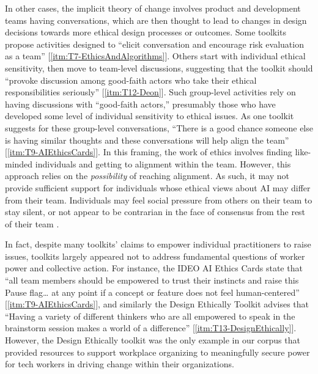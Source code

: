 \documentclass[acmsmall]{acmart}
\begin{document}
In other cases, the implicit theory of change involves product and development teams having conversations, which are then thought to lead to changes in design decisions towards more ethical design processes or outcomes. Some toolkits propose activities designed to ``elicit conversation and encourage risk evaluation as a team'' [\ref{itm:T7-EthicsAndAlgorithms}]. Others start with individual ethical sensitivity, then move to team-level discussions, suggesting that the toolkit should ``provoke discussion among good-faith actors who take their ethical responsibilities seriously'' [\ref{itm:T12-Deon}]. Such group-level activities rely on having discussions with ``good-faith actors,'' presumably those who have developed some level of individual sensitivity to ethical issues. As one toolkit suggests for these group-level conversations, ``There is a good chance someone else is having similar thoughts and these conversations will help align the team'' [\ref{itm:T9-AIEthicsCards}]. In this framing, the work of ethics involves finding like-minded individuals and getting to alignment within the team. However, this approach relies on the \textit{possibility} of reaching alignment. As such, it may not provide sufficient support for individuals whose ethical views about AI may differ from their team. Individuals may feel social pressure from others on their team to stay silent, or not appear to be contrarian in the face of consensus from the rest of their team \cite[cf.][]{madaio2020co}.

In fact, despite many toolkits' claims to empower individual practitioners to raise issues, toolkits largely appeared not to address fundamental questions of worker power and collective action. For instance, the IDEO AI Ethics Cards state that ``all team members should be empowered to trust their instincts and raise this Pause flag… at any point if a concept or feature does not feel human-centered'' [\ref{itm:T9-AIEthicsCards}], and similarly the Design Ethically Toolkit advises that ``Having a variety of different thinkers who are all empowered to speak in the brainstorm session makes a world of a difference'' [\ref{itm:T13-DesignEthically}]. However, the Design Ethically toolkit was the only example in our corpus that provided resources to support workplace organizing to meaningfully secure power for tech workers in driving change within their organizations. 
\end{document}

